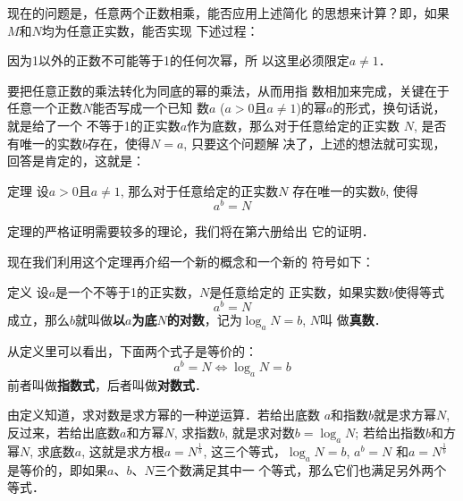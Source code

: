 现在的问题是，任意两个正数相乘，能否应用上述简化
的思想来计算？即，如果$M$和$N$均为任意正实数，能否实现
下述过程：
\begin{center}
\end{center}

\begin{rmk}
    因为1以外的正数不可能等于1的任何次幂，所
以这里必须限定$a\ne 1$．
\end{rmk}

要把任意正数的乘法转化为同底的幂的乘法，从而用指
数相加来完成，关键在于任意一个正数$N$能否写成一个已知
数$a$ ($a>0$且$a\ne1$)的幂$a$的形式，换句话说，就是给了一个
不等于1的正实数$a$作为底数，那么对于任意给定的正实数
$N$, 是否有唯一的实数$b$存在，使得$N=a$, 只要这个问题解
决了，上述的想法就可实现，回答是肯定的，这就是：

\begin{blk}{定理}
    设$a>0$且$a\ne 1$, 那么对于任意给定的正实数$N$
存在唯一的实数$b$, 使得
\[a^b=N\]
\end{blk}
 
定理的严格证明需要较多的理论，我们将在第六册给出
它的证明．

现在我们利用这个定理再介绍一个新的概念和一个新的
符号如下：

\begin{blk}{定义}
    设$a$是一个不等于1的正实数，$N$是任意给定的
正实数，如果实数$b$使得等式
\[a^b=N\]
成立，那么$b$就叫做\textbf{以$a$为底$N$的对数}，记为$\log_a N=b$, $N$叫
做\textbf{真数}．
\end{blk}
 
从定义里可以看出，下面两个式子是等价的：
\[a^b=N  \Longleftrightarrow \log_a N=b\]
前者叫做\textbf{指数式}，后者叫做\textbf{对数式}．

由定义知道，求对数是求方幂的一种逆运算．若给出底数
$a$和指数$b$就是求方幂$N$, 反过来，若给出底数$a$和方幂$N$, 
求指数$b$, 就是求对数$b=\log_a N$; 若给出指数$b$和方幂$N$, 求底数$a$, 这就是求方根$a=N^{\tfrac{1}{b}}$, 这三个等式，$\log_a N=b$, $a^b=N$
和$a=N^{\tfrac{1}{b}}$是等价的，即如果$a$、$b$、$N$三个数满足其中一
个等式，那么它们也满足另外两个等式．




